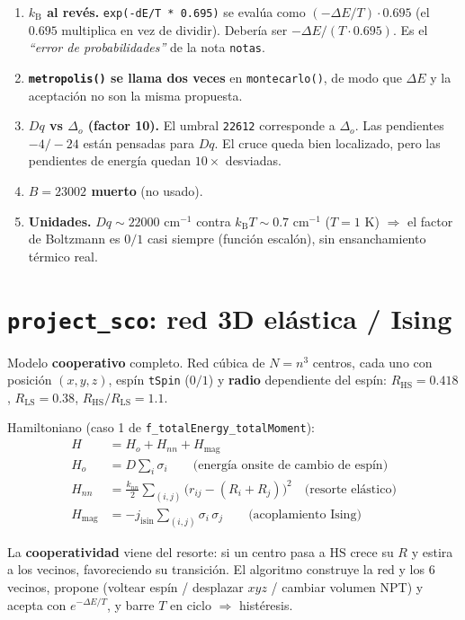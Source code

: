 \documentclass[11pt,a4paper]{article}
\newcommand{\HS}{\mathrm{HS}}
\newcommand{\LS}{\mathrm{LS}}
\newcommand{\Dq}{Dq}
\newcommand{\kb}{k_{\mathrm{B}}}
\begin{document}
\begin{enumerate}
\item \textbf{$\kb$ al revés.} \texttt{exp(-dE/T * 0.695)} se evalúa como
  $(-\Delta E/T)\cdot 0.695$ (el $0.695$ multiplica en vez de dividir). Debería
  ser $-\Delta E/(T\cdot 0.695)$. Es el \emph{``error de probabilidades''} de la
  nota \texttt{notas}.
\item \textbf{\texttt{metropolis()} se llama dos veces} en \texttt{montecarlo()},
  de modo que $\Delta E$ y la aceptación no son la misma propuesta.
\item \textbf{$\Dq$ vs $\Delta_o$ (factor 10).} El umbral \texttt{22612}
  corresponde a $\Delta_o$. Las pendientes $-4/-24$ están pensadas para $\Dq$.
  El cruce queda bien localizado, pero las pendientes de energía quedan $10\times$
  desviadas.
\item \textbf{$B=23002$ muerto} (no usado).
\item \textbf{Unidades.} $\Dq\sim 22000$ cm$^{-1}$ contra $\kb T \sim 0.7$
  cm$^{-1}$ ($T=1$ K) $\Rightarrow$ el factor de Boltzmann es $0/1$ casi siempre
  (función escalón), sin ensanchamiento térmico real.
\end{enumerate}

\section{\texttt{project\_sco}: red 3D elástica / Ising}

Modelo \textbf{cooperativo} completo. Red cúbica de $N=n^3$ centros, cada uno con
posición $(x,y,z)$, espín \texttt{tSpin} ($0/1$) y \textbf{radio} dependiente del
espín: $R_{\HS}=0.418$, $R_{\LS}=0.38$, $R_{\HS}/R_{\LS}=1.1$.

Hamiltoniano (caso 1 de \texttt{f\_totalEnergy\_totalMoment}):
\begin{align}
H &= H_o + H_{nn} + H_{\mathrm{mag}}\\
H_o &= D \sum_i \sigma_i \qquad \text{(energía onsite de cambio de espín)}\\
H_{nn} &= \frac{k_{nn}}{2}\sum_{(i,j)}\bigl(r_{ij}-(R_i+R_j)\bigr)^2 \quad \text{(resorte elástico)}\\
H_{\mathrm{mag}} &= -j_{\mathrm{isin}}\sum_{(i,j)} \sigma_i\,\sigma_j \qquad \text{(acoplamiento Ising)}
\end{align}

La \textbf{cooperatividad} viene del resorte: si un centro pasa a $\HS$ crece su
$R$ y estira a los vecinos, favoreciendo su transición. El algoritmo construye la
red y los 6 vecinos, propone (voltear espín / desplazar $xyz$ / cambiar volumen
NPT) y acepta con $e^{-\Delta E/T}$, y barre $T$ en ciclo $\Rightarrow$ histéresis.
\end{document}
